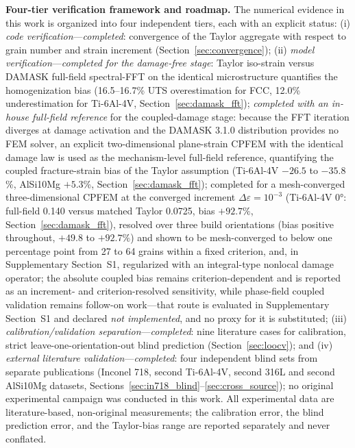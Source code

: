 \documentclass[12pt,a4paper,twocolumn]{article}
\begin{document}
\textbf{Four-tier verification framework and roadmap.} The numerical evidence in this work is organized into four independent tiers, each with an explicit status: (i) \emph{code verification}---\emph{completed}: convergence of the Taylor aggregate with respect to grain number and strain increment (Section~\ref{sec:convergence}); (ii) \emph{model verification}---\emph{completed for the damage-free stage}: Taylor iso-strain versus DAMASK full-field spectral-FFT on the identical microstructure quantifies the homogenization bias (16.5--16.7\% UTS overestimation for FCC, 12.0\% underestimation for Ti-6Al-4V, Section~\ref{sec:damask_fft}); \emph{completed with an in-house full-field reference} for the coupled-damage stage: because the FFT iteration diverges at damage activation and the DAMASK 3.1.0 distribution provides no FEM solver, an explicit two-dimensional plane-strain CPFEM with the identical damage law is used as the mechanism-level full-field reference, quantifying the coupled fracture-strain bias of the Taylor assumption (Ti-6Al-4V $-26.5$ to $-35.8$\%, AlSi10Mg $+5.3$\%, Section~\ref{sec:damask_fft}); completed for a mesh-converged three-dimensional CPFEM at the converged increment $\Delta\varepsilon=10^{-3}$ (Ti-6Al-4V $\ang{0}$: full-field 0.140 versus matched Taylor 0.0725, bias $+92.7\%$, Section~\ref{sec:damask_fft}), resolved over three build orientations (bias positive throughout, $+49.8$ to $+92.7\%$) and shown to be mesh-converged to below one percentage point from 27 to 64 grains within a fixed criterion, and, in Supplementary Section~S1, regularized with an integral-type nonlocal damage operator; the absolute coupled bias remains criterion-dependent and is reported as an increment- and criterion-resolved sensitivity, while phase-field coupled validation remains follow-on work---that route is evaluated in Supplementary Section~S1 and declared \emph{not implemented}, and no proxy for it is substituted; (iii) \emph{calibration/validation separation}---\emph{completed}: nine literature cases for calibration, strict leave-one-orientation-out blind prediction (Section~\ref{sec:loocv}); and (iv) \emph{external literature validation}---\emph{completed}: four independent blind sets from separate publications (Inconel 718, second Ti-6Al-4V, second 316L and second AlSi10Mg datasets, Sections~\ref{sec:in718_blind}--\ref{sec:cross_source}); no original experimental campaign was conducted in this work. All experimental data are literature-based, non-original measurements; the calibration error, the blind prediction error, and the Taylor-bias range are reported separately and never conflated.
\end{document}
